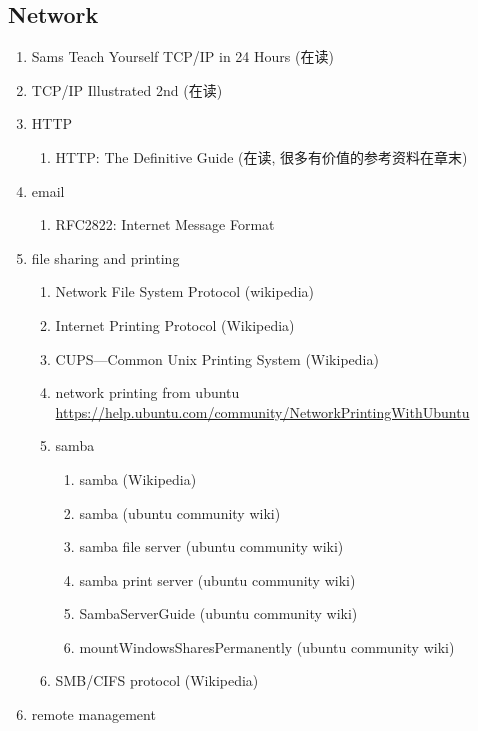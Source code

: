 \documentclass{article}
\begin{document}
\subsection{Network}
\begin{enumerate}
    \item Sams Teach Yourself TCP/IP in 24 Hours (在读)
    \item TCP/IP Illustrated 2nd (在读)
    \item HTTP
        \begin{enumerate}
            \item HTTP: The Definitive Guide (在读, 很多有价值的参考资料在章末)
        \end{enumerate}
    \item email
        \begin{enumerate}
            \item RFC2822: Internet Message Format
        \end{enumerate}
    \item file sharing and printing
        \begin{enumerate}
            \item Network File System Protocol (wikipedia)
            \item Internet Printing Protocol (Wikipedia)
            \item CUPS---Common Unix Printing System (Wikipedia)
            \item network printing from ubuntu \url{https://help.ubuntu.com/community/NetworkPrintingWithUbuntu}
            \item samba
                \begin{enumerate}
                    \item samba (Wikipedia)
                    \item samba (ubuntu community wiki)
                    \item samba file server (ubuntu community wiki)
                    \item samba print server (ubuntu community wiki)
                    \item SambaServerGuide (ubuntu community wiki)
                    \item mountWindowsSharesPermanently (ubuntu community wiki)
                \end{enumerate}
            \item SMB/CIFS protocol (Wikipedia)
        \end{enumerate}
    \item remote management

\end{enumerate}
\end{document}
